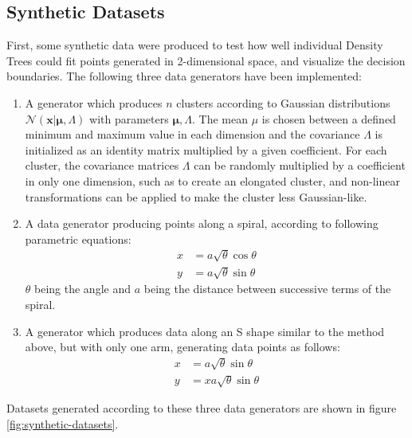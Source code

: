 \documentclass[10pt]{article}
\begin{document}
\subsection{Synthetic Datasets}
\label{subsec:data-synthetic}
First, some synthetic data were produced to test how well individual Density Trees could fit points generated in 2-dimensional space, and visualize the decision boundaries. The following three data generators have been implemented:
\begin{enumerate}
    \item A generator which produces $n$ clusters according to Gaussian distributions $\mathcal{N}(\mathbf{x}|\boldsymbol{\mu},\mathtt{\Lambda})$ with parameters $\boldsymbol{\mu},\mathtt{\Lambda}$. The mean $\mu$ is chosen between a defined minimum and maximum value in each dimension and the covariance $\mathtt{\Lambda}$ is initialized as an identity matrix multiplied by a given coefficient. For each cluster, the covariance matrices $\mathtt{\Lambda}$ can be randomly multiplied by a coefficient in only one dimension, such as to create an elongated cluster, and non-linear transformations can be applied to make the cluster less Gaussian-like.
    \item A data generator producing points along a spiral, according to following parametric equations:
    \begin{equation}
        \begin{aligned}
            x &= a\sqrt{\theta}\cos\theta\\
            y &= a\sqrt{\theta}\sin\theta
        \end{aligned}
    \end{equation}
    $\theta$  being the angle and $a$ being the distance between successive terms of the spiral.
    \item A generator which produces data along an S shape similar to the method above, but with only one arm, generating data points as follows:
    \begin{equation}
        \begin{aligned}
            x &= a\sqrt{\theta}\sin\theta\\
            y &= xa\sqrt{\theta}\sin\theta
        \end{aligned}
    \end{equation}
\end{enumerate}

Datasets generated according to these three data generators are shown in figure \ref{fig:synthetic-datasets}.
\end{document}
